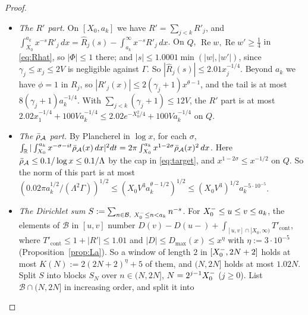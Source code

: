 \begin{proof}
\begin{itemize}
$\sum_{d\in\mathcal D}d^{-s}W(s)$, with $W$ as in \eqref{eq:ZBformula}. Each rigid $d$ with $[d/(1+\kappa),d]\subset[X_0,a_k]$ contributes
$d^{-s}W(s)$, and $|W(s)|\le3/(\kappa|t|)$. The at most $\kappa X_0+1$ rigid $d\in[X_0,(1+\kappa)X_0)$, and the at most $\kappa a_k+1$
rigid $d\in(a_k,(1+\kappa)a_k]$, have truncated ramps, each of modulus $\le2.01X_0^{-\sigma}/(\kappa|t|)$, respectively
$\le2.01(a_k/(1+\kappa))^{-\sigma}/(\kappa|t|)$. So this part is at most $(3Z_\infty(\frac34)/\kappa+3X_0^{1/4}+3a_k^{1/4})/|t|$, where
$\log Z_\infty(\frac34)\le2.47\sum_{2\le n<X_0}n^{-3/4}\le10X_0^{1/4}$ and $1/\kappa\le X_0$. As $|t|\ge0.99\Gamma$, the two parts together
are at most $6a_k^{1/4}/\Gamma\le12X_0V^3a_k^{-1/4}$ on $Q$, by \eqref{eq:Gammalow}.
\item \emph{The $R'$ part.} On $[X_0,a_k]$ we have $R'=\sum_{j<k}R'_j$, and
$\int_{X_0}^{a_k}x^{-s}R'_j\,dx=\widehat R_j(s)-\int_{a_k}^\infty x^{-s}R'_j\,dx$. On $Q$, $\operatorname{Re}w,\operatorname{Re}w'\ge\frac14$ in
\eqref{eq:Rhat}, so $|\Phi|\le1$ there; and $|s|\le1.0001\min(|w|,|w'|)$, since $\gamma_j\le x_j\le2V$ is negligible against $\Gamma$. So
$|\widehat R_j(s)|\le2.01x_j^{-1/4}$. Beyond $a_k$ we have $\phi=1$ in $R_j$, so $|R'_j(x)|\le2(\gamma_j+1)x^{\theta-1}$, and the tail
is at most $8(\gamma_j+1)a_k^{-1/4}$. With $\sum_{j<k}(\gamma_j+1)\le12V$, the $R'$ part is at most
$2.02x_1^{-1/4}+100Va_k^{-1/4}\le2.02e^{-X_0^2/4}+100Va_k^{-1/4}$ on $Q$.
\item \emph{The $\bar\rho_{\mathcal{A}}$ part.} By Plancherel in $\log x$, for each $\sigma$,
$\int_{\mathbb{R}}|\int_{X_0}^{a_k}x^{-\sigma-it}\bar\rho_{\mathcal{A}}(x)\,dx|^2dt=2\pi\int_{X_0}^{a_k}x^{1-2\sigma}\bar\rho_{\mathcal{A}}(x)^2\,dx$. Here
$\bar\rho_{\mathcal{A}}\le0.1/\log x\le0.1/\Lambda$ by the cap in \eqref{eq:target}, and $x^{1-2\sigma}\le x^{-1/2}$ on $Q$. So the norm of this part
is at most $(0.02\pi a_k^{1/2}/(\Lambda^2\Gamma))^{1/2}\le(X_0V^3a_k^{\theta-1/2})^{1/2}\le(X_0V^3)^{1/2}a_k^{-5\cdot10^{-5}}$.
\item \emph{The Dirichlet sum} $S:=\sum_{n\in\mathcal B,\ X_0^{-}\le n<a_k}n^{-s}$. For $X_0^{-}\le u\le v\le a_k$, the elements of $\mathcal B$ in
$[u,v]$ number $D(v)-D(u-)+\int_{[u,v]\cap[X_0,\infty)}T'_{\mathrm{cont}}$, where $T'_{\mathrm{cont}}\le1+|R'|\le1.01$ and $|D|\le D_{\max}(x)\le x^{\eta}$ with $\eta:=3\cdot10^{-5}$
(Proposition~\ref{prop:La}). So a window of length $2$ in $[X_0^{-},2N+2]$ holds at most $K(N):=2(2N+2)^{\eta}+5$ of them, and $(N,2N]$ holds at most $1.02N$. Split $S$
into blocks $S_N$ over $n\in(N,2N]$, $N=2^{j-1}X_0^{-}$ ($j\ge0$). List $\mathcal B\cap(N,2N]$ in increasing order, and split it into

\end{itemize}
\end{proof}
